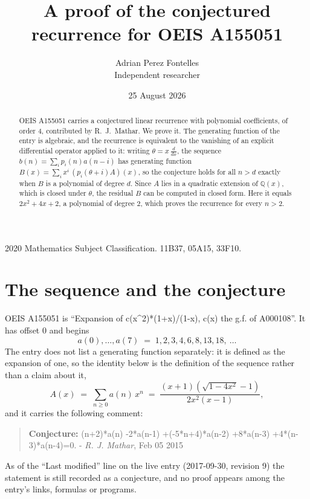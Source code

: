 \documentclass[11pt,a4paper]{article}
\title{A proof of the conjectured recurrence for OEIS A155051}
\author{Adrian Perez Fontelles\\ \small Independent researcher}
\date{25 August 2026}
\theoremstyle{plain}
\theoremstyle{definition}
\begin{document}
\maketitle

\begin{abstract}
OEIS A155051 carries a conjectured linear recurrence with polynomial coefficients, of
order 4, contributed by R.~J.~Mathar. We prove it. The generating function of the
entry is algebraic, and the recurrence is equivalent to the vanishing of an explicit
differential operator applied to it: writing $\theta=x\,\frac{d}{dx}$, the sequence
$b(n)=\sum_{i}p_{i}(n)a(n-i)$ has generating function
$B(x)=\sum_{i}x^{i}\,(p_{i}(\theta+i)A)(x)$, so the conjecture holds for all $n>d$ exactly
when $B$ is a polynomial of degree $d$. Since $A$ lies in a quadratic extension of
$\mathbb{Q}(x)$, which is closed under $\theta$, the residual $B$ can be computed in
closed form. Here it equals $2 x^{2} + 4 x + 2$, a polynomial of degree $2$, which proves
the recurrence for every $n>2$.
\end{abstract}

\noindent\small 2020 Mathematics Subject Classification. 11B37, 05A15, 33F10.\normalsize

\section{The sequence and the conjecture}

OEIS A155051 is ``Expansion of c(x\^{}2)*(1+x)/(1-x), c(x) the g.f. of A000108''. It has offset $0$ and begins
\[
a(0),\dots,a(7)\;=\;1, 2, 3, 4, 6, 8, 13, 18,\ \dots
\]
The entry does not list a generating function separately: it is defined as the
expansion of one, so the identity below is the definition of the sequence rather than a
claim about it,
\begin{equation}\label{eq:gf}
A(x)\;=\;\sum_{n\ge 0} a(n)\,x^{n}\;=\;\frac{\left(x + 1\right) \left(\sqrt{1 - 4 x^{2}} - 1\right)}{2 x^{2} \left(x - 1\right)} ,
\end{equation}
and it carries the following comment:
\begin{quote}\small
\textbf{Conjecture:} (n+2)*a(n) -2*a(n-1) +(-5*n+4)*a(n-2) +8*a(n-3) +4*(n-3)*a(n-4)=0. - \emph{R. J. Mathar}, Feb 05 2015
\end{quote}
As of the ``Last modified'' line on the live entry (2017-09-30, revision 9) the
statement is still recorded as a conjecture, and no proof appears among the entry's links,
formulas or programs.
\end{document}
